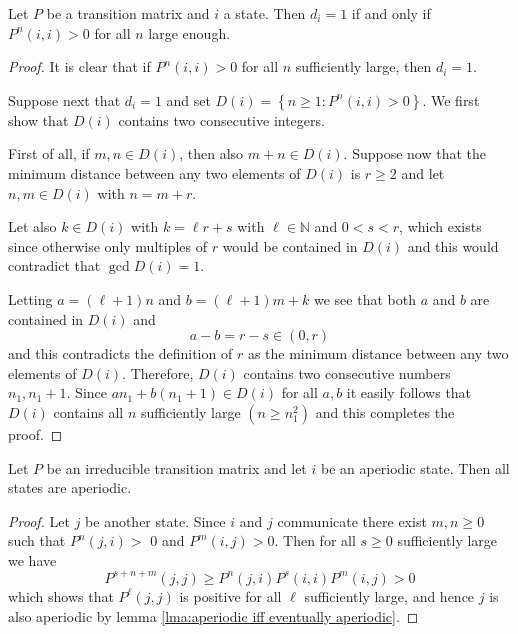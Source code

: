 \documentclass[a4paper]{article}
\begin{document}
\begin{lemma}\label{lma:aperiodic iff eventually aperiodic}
    Let $P$ be a transition matrix and $i$ a state. Then $d_i=1$ if and only if $P^n(i, i)>0$ for all $n$ large enough.
\end{lemma}
\begin{proof}
    It is clear that if $P^n(i, i)>0$ for all $n$ sufficiently large, then $d_i=1$.

    Suppose next that $d_i=1$ and set $D(i)=\left\{n \geq 1: P^n(i, i)>0\right\}$. We first show that $D(i)$ contains two consecutive integers. 
    
    First of all, if $m, n \in D(i)$, then also $m+n \in D(i)$. Suppose now that the minimum distance between any two elements of $D(i)$ is $r \geq 2$ and let $n, m \in D(i)$ with $n=m+r$. 
    
    Let also $k \in D(i)$ with $k=\ell r+s$ with $\ell \in \mathbb{N}$ and $0<s<r$, which exists since otherwise only multiples of $r$ would be contained in $D(i)$ and this would contradict that $ \gcd D(i)=1 $. 
    
    Letting $a=(\ell+1) n$ and $b=(\ell+1) m+k$ we see that both $a$ and $b$ are contained in $D(i)$ and
    \[
    a-b=r-s \in(0, r)
    \]
    and this contradicts the definition of $r$ as the minimum distance between any two elements of $D(i)$. Therefore, $D(i)$ contains two consecutive numbers $n_1, n_1+1$. Since $a n_1+b\left(n_1+1\right) \in D(i)$ for all $a, b$ it easily follows that $D(i)$ contains all $n$ sufficiently large $\left(n \geq n_1^2\right)$ and this completes the proof.
\end{proof}

\begin{lemma}
    Let $P$ be an irreducible transition matrix and let $i$ be an aperiodic state. Then all states are aperiodic.
\end{lemma}
\begin{proof}
    Let $j$ be another state. Since $i$ and $j$ communicate there exist $m, n \geq 0$ such that $P^n(j, i)>$ 0 and $P^m(i, j)>0$. Then for all $s \geq 0$ sufficiently large we have
    \[
    P^{s+n+m}(j, j) \geq P^n(j, i) P^s(i, i) P^m(i, j)>0
    \]
    which shows that $P^{\ell}(j, j)$ is positive for all $\ell$ sufficiently large, and hence $j$ is also aperiodic by lemma \ref{lma:aperiodic iff eventually aperiodic}.
\end{proof}
\end{document}
